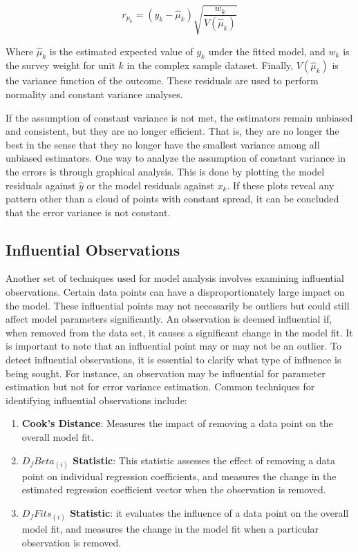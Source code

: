 \documentclass[
  12pt,
]{book}
\begin{document}
\[
r_{p_{k}} = \left( y_{k} - \widehat \mu_{k} \right) \sqrt{\frac{w_{k}} {V\left(\hat{\mu}_{k}\right)}}
\]

Where \(\widehat \mu_{k}\) is the estimated expected value of \(y_{k}\) under the fitted model, and \(w_{k}\) is the survey weight for unit \(k\) in the complex sample dataset. Finally, \(V(\widehat \mu_{k})\) is the variance function of the outcome. These residuals are used to perform normality and constant variance analyses.

If the assumption of constant variance is not met, the estimators remain unbiased and consistent, but they are no longer efficient. That is, they are no longer the best in the sense that they no longer have the smallest variance among all unbiased estimators. One way to analyze the assumption of constant variance in the errors is through graphical analysis. This is done by plotting the model residuals against \(\widehat {y}\) or the model residuals against \(x_{k}\). If these plots reveal any pattern other than a cloud of points with constant spread, it can be concluded that the error variance is not constant.

\hypertarget{influential-observations}{%
\subsection{Influential Observations}\label{influential-observations}}

Another set of techniques used for model analysis involves examining influential observations. Certain data points can have a disproportionately large impact on the model. These influential points may not necessarily be outliers but could still affect model parameters significantly. An observation is deemed influential if, when removed from the data set, it causes a significant change in the model fit. It is important to note that an influential point may or may not be an outlier. To detect influential observations, it is essential to clarify what type of influence is being sought. For instance, an observation may be influential for parameter estimation but not for error variance estimation. Common techniques for identifying influential observations include:

\begin{enumerate}
\def\labelenumi{\arabic{enumi}.}
\item
  \textbf{Cook's Distance}: Measures the impact of removing a data point on the overall model fit.
\item
  \textbf{\(D_fBeta_{(i)}\) Statistic}: This statistic assesses the effect of removing a data point on individual regression coefficients, and measures the change in the estimated regression coefficient vector when the observation is removed.
\item
  \textbf{\(D_{f}Fits_{\left(i\right)}\) Statistic}: it evaluates the influence of a data point on the overall model fit, and measures the change in the model fit when a particular observation is removed.
\end{enumerate}
\end{document}
